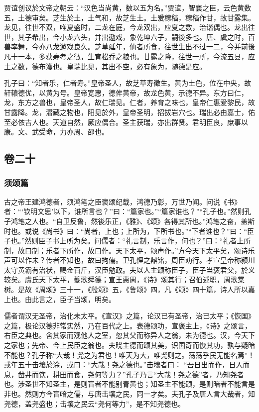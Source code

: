 \documentclass[]{article}
\begin{document}
贾谊创议於文帝之朝云：``汉色当尚黄，数以五为名。''贾谊，智襄之臣，云色黄数五，土德审矣。芝生於土，土气和，故芝生土。土爰稼穑，稼穑作甘，故甘露集。龙见，往世不双，唯夏盛时，二龙在庭，今龙双出，应夏之数，治谐偶也。龙出往世，其子希出，今小龙六头，并出遨戏，象乾坤六子，嗣後多也。唐、虞之时，百兽率舞，今亦八龙遨戏良久。芝草延年，仙者所食，往世生出不过一二，今并前後凡十一本，多获寿考之徵，生育松乔之粮也。甘露之降，往世一所，今流五县，应土之数，德布濩也。皇瑞比见，其出不空，必有象为，随德是应。

孔子曰：``知者乐，仁者寿。''皇帝圣人，故芝草寿徵生。黄为土色，位在中央，故轩辕德优，以黄为号。皇帝宽惠，德侔黄帝，故龙色黄，示德不异。东方曰仁，龙，东方之兽也，皇帝圣人，故仁瑞见。仁者，养育之味也，皇帝仁惠爱黎民，故甘露降。龙，潜藏之物也，阳见於外，皇帝圣明，招拔岩穴也。瑞出必由嘉士，佑至必依吉人也。天道自然，厥应偶合。圣主获瑞，亦出群贤。君明臣良，庶事以康。文、武受命，力亦周、邵也。

\hypertarget{header-n789}{%
\subsection{卷二十}\label{header-n789}}

\hypertarget{header-n790}{%
\subsubsection{须颂篇}\label{header-n790}}

古之帝王建鸿德者，须鸿笔之臣褒颂纪载，鸿德乃彰，万世乃闻。问说《书》者：```钦明文思'以下，谁所言也？''曰：``篇家也。''``篇家谁也？''``孔子也。''然则孔子鸿笔之人也。``自卫反鲁，然後乐正，《雅》、《颂》各得其所也。''鸿笔之奋，盖斯时也。或说《尚书》曰：``尚者，上也；上所为，下所书也。''``下者谁也？''曰：``臣子也。''然则臣子书上所为矣。问儒者：``礼言制，乐言作，何也？''曰：``礼者上所制，故曰制；乐者下所作，故曰作。天下太平，颂声作。''方今天下太平矣，颂诗乐声可以作未？传者不知也，故曰拘儒。卫孔悝之鼎铭，周臣劝行。孝宣皇帝称颍川太守黄霸有治状，赐金百斤，汉臣勉政。夫以人主颂称臣子，臣子当褒君父，於义较矣。虞氏天下太平，夔歌舜德；宣王惠周，《诗》颂其行；召伯述职，周歌棠树。是故《周颂》三十一，《殷颂》五，《鲁颂》四，凡《颂》四十篇，诗人所以嘉上也。由此言之，臣子当颂，明矣。

儒者谓汉无圣帝，治化未太平。《宣汉》之篇，论汉已有圣帝，治已太平；《恢国》之篇，极论汉德非常实然，乃在百代之上。表德颂功，宣褒主上，《诗》之颂言，右臣之典也。舍其家而观他人之室，忽其父而称异人之翁，未为德也。汉，今天下之家也；先帝、今上民臣之翁也。夫晓主德而颂其美，识国奇而恢其功，孰与疑暗不能也？孔子称``大哉！尧之为君也！唯天为大，唯尧则之。荡荡乎民无能名焉''！或年五十击壤於涂，或曰：``大哉！尧之德也。''击壤者曰：
``吾日出而作，日入而息，凿井而饮，耕田而食，尧何等力？''孔子乃言``大哉！尧之德''者，乃知尧者也。涉圣世不知圣主，是则盲者不能别青黄也；知圣主不能颂，是则暗者不能言是非也。然则方今盲喑之儒，与唐击壤之民，同一才矣。夫孔子及唐人言大哉者，知尧德，盖尧盛也；击壤之民云``尧何等力''，是不知尧德也。
\end{document}
